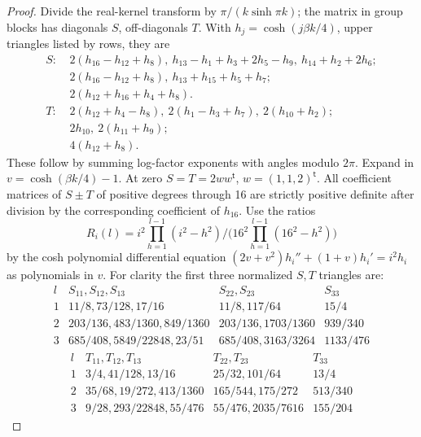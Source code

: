 \begin{proof}
Divide the real-kernel transform by \(\pi/(k\sinh\pi k)\); the matrix in group blocks has diagonals \(S\), off-diagonals \(T\). With \(h_j=\cosh(j\beta k/4)\), upper triangles listed by rows, they are
\[
\begin{split}
 S:\ &2(h_{16}-h_{12}+h_8),\ h_{13}-h_1+h_3+2h_5-h_9,\ h_{14}+h_2+2h_6;\\
     &2(h_{16}-h_{12}+h_8),\ h_{13}+h_{15}+h_5+h_7;\\
     &2(h_{12}+h_{16}+h_4+h_8).\\
 T:\ &2(h_{12}+h_4-h_8),\ 2(h_1-h_3+h_7),\ 2(h_{10}+h_2);\\
     &2h_{10},\ 2(h_{11}+h_9);\\
     &4(h_{12}+h_8).
\end{split}
\]
These follow by summing log-factor exponents with angles modulo \(2\pi\). Expand in \(v=\cosh(\beta k/4)-1\). At zero \(S=T=2w w^{\mathsf t}\), \(w=(1,1,2)^{\mathsf t}\). All coefficient matrices of \(S\pm T\) of positive degrees through 16 are strictly positive definite after division by the corresponding coefficient of \(h_{16}\). Use the ratios
\[
 R_i(l)=i^2\prod_{h=1}^{l-1}(i^2-h^2)\big/\big(16^2\prod_{h=1}^{l-1}(16^2-h^2)\big)
\]
by the cosh polynomial differential equation \((2v+v^2)h_i''+(1+v)h_i'=i^2 h_i\) as polynomials in \(v\). For clarity the first three normalized \(S,T\) triangles are:
\[
\begin{array}{c|lll}
 l&S_{11},S_{12},S_{13}&S_{22},S_{23}&S_{33}\\\hline
1 &11/8,73/128,17/16&11/8,117/64&15/4\\
2 &203/136,483/1360,849/1360&203/136,1703/1360&939/340\\
3 &685/408,5849/22848,23/51&685/408,3163/3264&1133/476
\end{array}
\]
\[
\begin{array}{c|lll}
 l&T_{11},T_{12},T_{13}&T_{22},T_{23}&T_{33}\\\hline
1 &3/4,41/128,13/16&25/32,101/64&13/4\\
2 &35/68,19/272,413/1360&165/544,175/272&513/340\\
3 &9/28,293/22848,55/476&55/476,2035/7616&155/204
\end{array}
\]

\end{proof}
